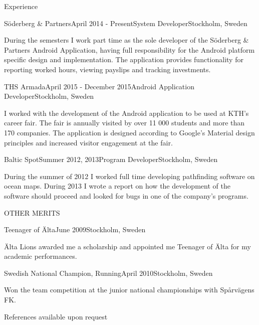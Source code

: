 \documentclass{resume} %
\begin{document}
\begin{rSection}{Experience}

\begin{rSubsection}{Söderberg \& Partners}{April 2014 - Present}{System Developer}{Stockholm, Sweden}
\item During the semesters I work part time as the sole developer of the Söderberg \& Partners Android Application, having full responsibility for the Android platform specific design and implementation. The application provides functionality for reporting worked hours, viewing payslips and tracking investments.

\end{rSubsection}

\begin{rSubsection}{THS Armada}{April 2015 - December 2015}{Android Application Developer}{Stockholm, Sweden}
\item I worked with the development of the Android application to be used at KTH's career fair. The fair is annually visited by over 11 000 students and more than 170 companies. The application is designed according to Google's Material design principles and increased visitor engagement at the fair.
\end{rSubsection}

\begin{rSubsection}{Baltic Spot}{Summer 2012, 2013}{Program Developer}{Stockholm, Sweden}
\item During the summer of 2012 I worked full time developing pathfinding software on ocean maps. During 2013 I wrote a report on how the development of the software should proceed and looked for bugs in one of the company's programs.

\end{rSubsection}
\end{rSection}

\begin{rSection}{OTHER MERITS}

\begin{rSubsection}{Teenager of Älta}{June 2009}{}{Stockholm, Sweden}
\item Älta Lions awarded me a scholarship and appointed me Teenager of Älta for my academic performances.
\end{rSubsection}

\begin{rSubsection}{Swedish National Champion, Running}{April 2010}{}{Stockholm, Sweden}
\item Won the team competition at the junior national championships with Spårvägens FK.
\end{rSubsection}


References available upon request
\end{rSection}
\end{document}
